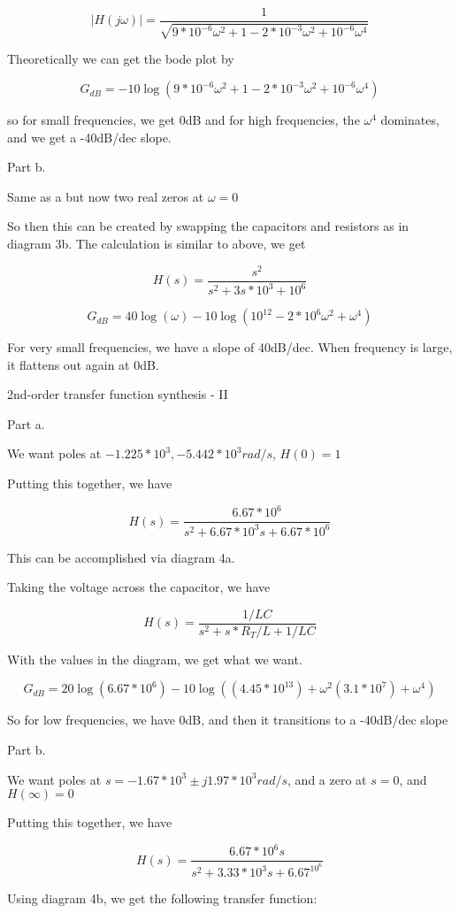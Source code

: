 \documentclass{article}
\begin{document}
$$|H(j\omega)| = \frac{1}{\sqrt{9*10^{-6}\omega^2 + 1 - 2*10^{-3}\omega^2+ 10^{-6}\omega^4}} $$
 
Theoretically we can get the bode plot by 

$$G_{dB} = -10 \log (9*10^{-6}\omega^2 + 1 - 2*10^{-3}\omega^2+ 10^{-6}\omega^4) $$

so for small frequencies, we get 0dB and for high frequencies, the ${\omega^4}$ dominates, and we get a -40dB/dec slope.
 
 
Part b.

Same as a but now two real zeros at $\omega = 0$

So then this can be created by swapping the capacitors and resistors as in diagram 3b. The calculation is similar to above, we get 

 $$H(s) =  \frac{s^2}{s^2 + 3s*10^{3} + 10^6}$$
 
 $$G_{dB} = 40 \log (\omega) -10 \log (10^{12} - 2*10^{6}\omega^2+\omega^4) $$

For very small frequencies, we have a slope of 40dB/dec. When frequency is large, it flattens out again at 0dB.

2nd-order transfer function synthesis - II 

Part a. 

We want poles at $-1.225*10^3, -5.442*10^3 rad/s$, $H(0) = 1$

Putting this together, we have 

$$H(s) = \frac{6.67*10^6}{s^2+6.67*10^3s + 6.67*10^6}$$

This can be accomplished via diagram 4a.

Taking the voltage across the capacitor, we have 

$$H(s) = \frac{1/LC}{s^2 + s*R_T/L+1/LC}$$

With the values in the diagram, we get what we want. 

 $$G_{dB} = 20 \log (6.67 *10^6) - 10 \log ((4.45*10^{13})+\omega^2(3.1*10^7)+\omega^4)$$
 
 So for low frequencies, we have 0dB, and then it transitions to a -40dB/dec slope
 

Part b.

We want poles at $s = -1.67*10^3 \pm j1.97*10^3 rad/s$, and a zero at $s=0$, and $H(\infty) = 0$

Putting this together, we have

$$H(s) = \frac{6.67*10^6s}{s^2+3.33*10^3s+6.67^10^6}$$

Using diagram 4b, we get the following transfer function:
\end{document}
